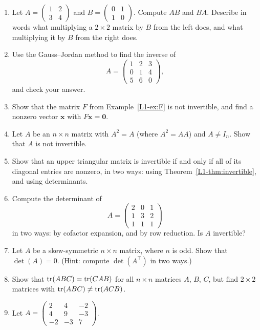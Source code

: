 \begin{enumerate}[leftmargin=*]
	\item \homework{} Let $A = \begin{pmatrix} 1 & 2 \\ 3 & 4 \end{pmatrix}$ and $B = \begin{pmatrix} 0 & 1 \\ 1 & 0 \end{pmatrix}$. Compute $AB$ and $BA$. Describe in words what multiplying a $2 \times 2$ matrix by $B$ from the left does, and what multiplying it by $B$ from the right does.
	\item \homework{} Use the Gauss--Jordan method to find the inverse of
	\[A = \begin{pmatrix}
		1 & 2 & 3 \\
		0 & 1 & 4 \\
		5 & 6 & 0
	\end{pmatrix},\]
	and check your answer.
	\item \homework{} Show that the matrix $F$ from Example~\ref{L1-ex:F} is not invertible, and find a nonzero vector $\mathbf{x}$ with $F\mathbf{x} = \mathbf{0}$.
	\item \homework{} Let $A$ be an $n \times n$ matrix with $A^2 = A$ (where $A^2 = AA$) and $A \neq I_n$. Show that $A$ is not invertible.
	\item Show that an upper triangular matrix is invertible if and only if all of its diagonal entries are nonzero, in two ways: using Theorem~\ref{L1-thm:invertible}, and using determinants.
	\item \homework{} Compute the determinant of
	\[A = \begin{pmatrix}
		2 & 0 & 1 \\
		1 & 3 & 2 \\
		1 & 1 & 1
	\end{pmatrix}\]
	in two ways: by cofactor expansion, and by row reduction. Is $A$ invertible?
	\item \homework{} Let $A$ be a skew-symmetric $n \times n$ matrix, where $n$ is odd. Show that $\det(A) = 0$. (Hint: compute $\det(A^\top)$ in two ways.)
	\item \homework{} Show that $\operatorname{tr}(ABC) = \operatorname{tr}(CAB)$ for all $n \times n$ matrices $A$, $B$, $C$, but find $2 \times 2$ matrices with $\operatorname{tr}(ABC) \neq \operatorname{tr}(ACB)$.
	\item \homework{} Let $A = \begin{pmatrix} 2 & 4 & -2 \\ 4 & 9 & -3 \\ -2 & -3 & 7 \end{pmatrix}$.

\end{enumerate}
